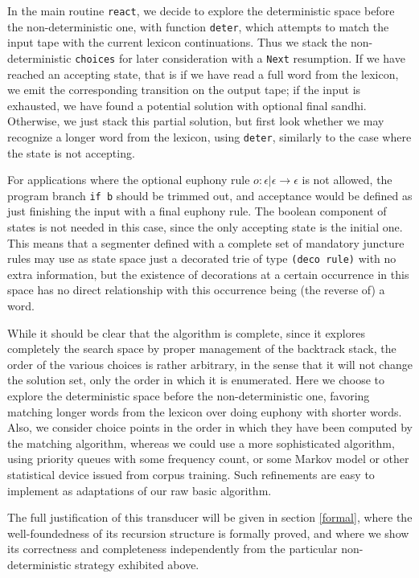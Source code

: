 In the main routine \verb:react:, we decide to explore the 
deterministic space before the non-deterministic one, with 
function \verb:deter:, which attempts to match the input tape with 
the current lexicon continuations. Thus
we stack the non-deterministic \verb:choices: for later consideration
with a \verb:Next: resumption. 
If we have reached an accepting state, that is if we have read a full word
from the lexicon, we emit the corresponding transition on the
output tape; if the input is exhausted, we have found a potential solution
with optional final sandhi. Otherwise, we just stack this partial solution,
but first look whether we may recognize a longer word from the lexicon,
using \verb:deter:, similarly to the case where the state is not accepting.

For applications where the optional euphony rule
$o:\epsilon|\epsilon\rightarrow\epsilon$ is not allowed, 
the program branch \verb:if b: should be
trimmed out, and acceptance would be defined as just finishing the input with a
final euphony rule. The boolean component of states is not needed in this case,
since the only accepting state is the initial one. This means that a segmenter
defined with a complete set of mandatory juncture rules may use as state
space just a decorated trie of type \verb:(deco rule):
with no extra information, but the existence of
decorations at a certain occurrence in this space has no direct relationship
with this occurrence being (the reverse of) a word.

While it should be clear that the algorithm is complete, since it explores
completely the search space by proper management of the backtrack stack, 
the order of the various choices is rather arbitrary, in the sense that
it will not change the solution set, only the order in which it is
enumerated. Here we choose to explore the deterministic space before
the non-deterministic one, favoring matching longer words from the lexicon over
doing euphony with shorter words. 
Also, we consider choice points in the order
in which they have been computed by the matching algorithm, whereas we
could use a more sophisticated algorithm, using priority queues with
some frequency count, or some Markov model or other statistical device
issued from corpus training. Such refinements are easy to implement 
as adaptations of our raw basic algorithm. 

The full justification of this transducer will be given in section 
\ref{formal}, where the well-foundedness of its recursion structure is formally
proved, and where we show its correctness and completeness independently
from the particular non-deterministic strategy exhibited above.


